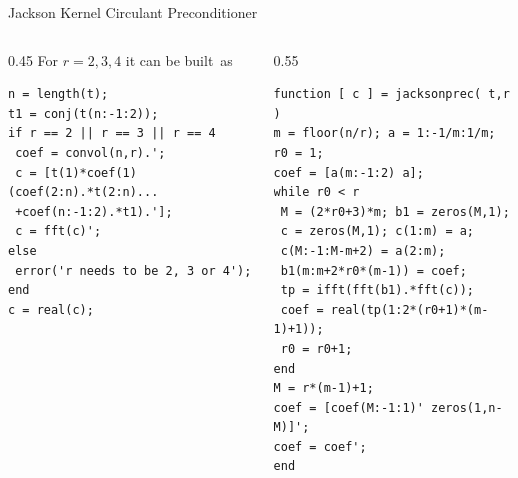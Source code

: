 \documentclass[aspectratio=169,xcolor=dvipsnames]{beamer}
\begin{document}
\begin{frame}[fragile]{\faWrench\;Jackson Kernel Circulant Preconditioner}\vspace{-0.5em}

\begin{columns}
\begin{column}{0.45\columnwidth}
For $r=2,3,4$ it can be built~as

\begin{verbatim}
n = length(t);
t1 = conj(t(n:-1:2));
if r == 2 || r == 3 || r == 4
 coef = convol(n,r).';
 c = [t(1)*coef(1) (coef(2:n).*t(2:n)...
 +coef(n:-1:2).*t1).'];
 c = fft(c)';
else
 error('r needs to be 2, 3 or 4');
end
c = real(c);
\end{verbatim}
\end{column}
\begin{column}{0.55\columnwidth}
\begin{verbatim}
function [ c ] = jacksonprec( t,r )
m = floor(n/r); a = 1:-1/m:1/m; r0 = 1;
coef = [a(m:-1:2) a];
while r0 < r
 M = (2*r0+3)*m; b1 = zeros(M,1);
 c = zeros(M,1); c(1:m) = a;
 c(M:-1:M-m+2) = a(2:m);
 b1(m:m+2*r0*(m-1)) = coef;
 tp = ifft(fft(b1).*fft(c));
 coef = real(tp(1:2*(r0+1)*(m-1)+1));
 r0 = r0+1;
end
M = r*(m-1)+1;
coef = [coef(M:-1:1)' zeros(1,n-M)]';
coef = coef';
end
\end{verbatim}
\end{column}
\end{columns}

\end{frame}
\end{document}
